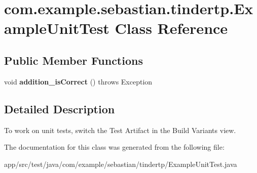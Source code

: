 \hypertarget{classcom_1_1example_1_1sebastian_1_1tindertp_1_1ExampleUnitTest}{}\section{com.\+example.\+sebastian.\+tindertp.\+Example\+Unit\+Test Class Reference}
\label{classcom_1_1example_1_1sebastian_1_1tindertp_1_1ExampleUnitTest}
\subsection*{Public Member Functions}
\begin{DoxyCompactItemize}
\item 
void {\bfseries addition\+\_\+is\+Correct} ()  throws Exception \hypertarget{classcom_1_1example_1_1sebastian_1_1tindertp_1_1ExampleUnitTest_a3b09c71f46aae958ceefd11ad5dd5aac}{}\label{classcom_1_1example_1_1sebastian_1_1tindertp_1_1ExampleUnitTest_a3b09c71f46aae958ceefd11ad5dd5aac}

\end{DoxyCompactItemize}


\subsection{Detailed Description}
To work on unit tests, switch the Test Artifact in the Build Variants view. 

The documentation for this class was generated from the following file\+:\begin{DoxyCompactItemize}
\item 
app/src/test/java/com/example/sebastian/tindertp/Example\+Unit\+Test.\+java\end{DoxyCompactItemize}
